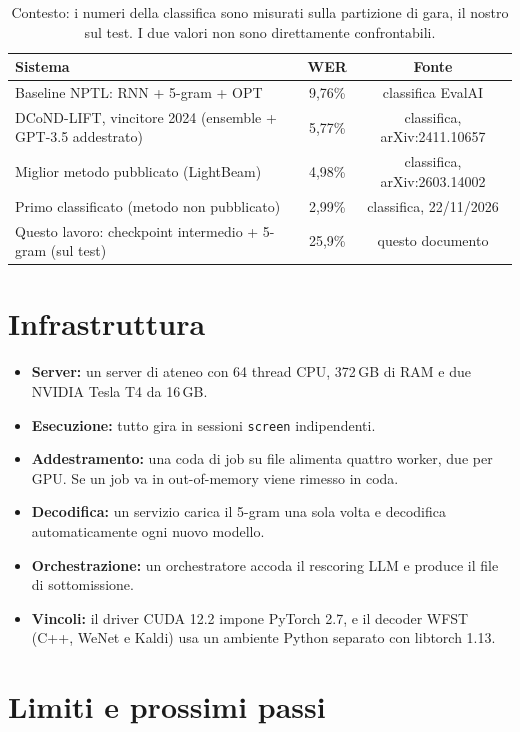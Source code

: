 \documentclass[10pt,a4paper]{article}
\begin{document}
\begin{table}[h]
\centering\small
\begin{tabular}{lcc}
\toprule
\textbf{Sistema} & \textbf{WER} & \textbf{Fonte} \\
\midrule
Baseline NPTL: RNN + 5-gram + OPT & 9{,}76\% & classifica EvalAI \\
DCoND-LIFT, vincitore 2024 (ensemble + GPT-3.5 addestrato) & 5{,}77\% & classifica, arXiv:2411.10657 \\
Miglior metodo pubblicato (LightBeam) & 4{,}98\% & classifica, arXiv:2603.14002 \\
Primo classificato (metodo non pubblicato) & 2{,}99\% & classifica, 22/11/2026 \\
\midrule
Questo lavoro: checkpoint intermedio + 5-gram (sul test) & 25{,}9\% & questo documento \\
\bottomrule
\end{tabular}
\caption{Contesto: i numeri della classifica sono misurati sulla partizione di gara, il nostro sul test. I due valori non sono direttamente confrontabili.}
\label{tab:classifica}
\end{table}


\section{Infrastruttura}

\begin{itemize}\setlength\itemsep{0pt}
\item \textbf{Server:} un server di ateneo con 64 thread CPU, 372\,GB di RAM e due NVIDIA Tesla T4 da 16\,GB.
\item \textbf{Esecuzione:} tutto gira in sessioni \texttt{screen} indipendenti.
\item \textbf{Addestramento:} una coda di job su file alimenta quattro worker, due per GPU. Se un job va in out-of-memory viene rimesso in coda.
\item \textbf{Decodifica:} un servizio carica il 5-gram una sola volta e decodifica automaticamente ogni nuovo modello.
\item \textbf{Orchestrazione:} un orchestratore accoda il rescoring LLM e produce il file di sottomissione.
\item \textbf{Vincoli:} il driver CUDA 12.2 impone PyTorch 2.7, e il decoder WFST (C++, WeNet e Kaldi) usa un ambiente Python separato con libtorch 1.13.
\end{itemize}

\section{Limiti e prossimi passi}
\end{document}

